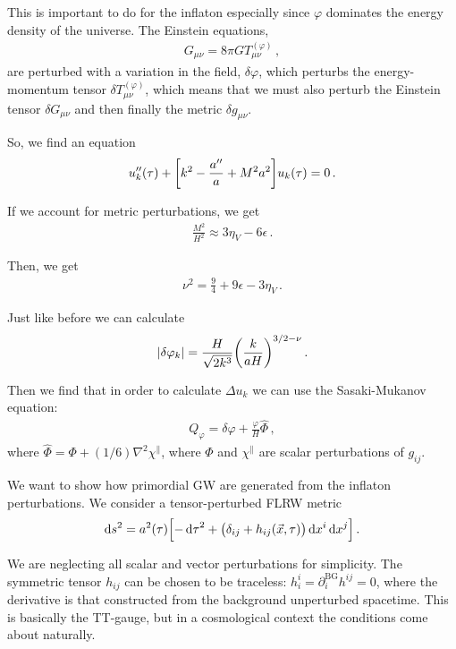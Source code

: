 \documentclass[main.tex]{subfiles}
\begin{document}
This is important to do for the inflaton especially since \(\varphi \) dominates the energy density of the universe. 
The Einstein equations, 
%
\begin{align}
G_{\mu \nu } = 8 \pi G T_{\mu \nu }^{(\varphi )}
\,,
\end{align}
%
are perturbed with a variation in the field, \(\delta \varphi \), which perturbs the energy-momentum tensor \(\delta T_{\mu \nu }^{(\varphi )}\), which means that we must also perturb the Einstein tensor \(\delta G_{\mu \nu} \) and then finally the metric \(\delta g_{\mu \nu }\). 

So, we find an equation 
%
\begin{align}
u''_k (\tau ) + \qty[ k^2 - \frac{a''}{a} + M^2a^2] u_k (\tau ) = 0
\,.
\end{align}

If we account for metric perturbations, we get 
%
\begin{align}
\frac{M^2}{H^2} \approx 3 \eta _V - 6 \epsilon 
\,.
\end{align}

Then, we get 
%
\begin{align}
\nu^2 = \frac{9}{4} + 9 \epsilon - 3 \eta _V 
\,.
\end{align}

Just like before we can calculate 
%
\begin{align}
\abs{ \delta \varphi _k} = \frac{H}{\sqrt{2 k^3}} \qty( \frac{k}{aH})^{3/2 - \nu }
\,.
\end{align}

Then we find that in order to calculate \(\Delta u_k\) we can use the Sasaki-Mukanov equation:
%
\begin{align}
Q_\varphi = \delta \varphi + \frac{\varphi }{H} \hat{\Phi}
\,,
\end{align}
%
where \(\hat{\Phi} = \Phi + (1/6) \nabla^2 \chi^{\parallel}\), where \(\Phi \) and \(\chi^{\parallel}\) are scalar perturbations of \(g_{ij}\).

We want to show how primordial GW are generated from the inflaton perturbations.
We consider a tensor-perturbed FLRW metric 
%
\begin{align}
\dd{s^2} = a^2 (\tau )
\qty[- \dd{\tau}^2 + \qty(\delta_{ij} + h_{ij} (\vec{x}, \tau )) \dd{x^{i}} \dd{x^{j}}]
\,.
\end{align}

We are neglecting all scalar and vector perturbations for simplicity. 
The symmetric tensor \(h_{ij}\) can be chosen to be traceless: \(h^{i}_{i} = \partial_{i}^{\text{BG}} h^{ij} = 0 \), where the derivative is that constructed from the background unperturbed spacetime. 
This is basically the TT-gauge, but in a cosmological context the conditions come about naturally. 
\end{document}
